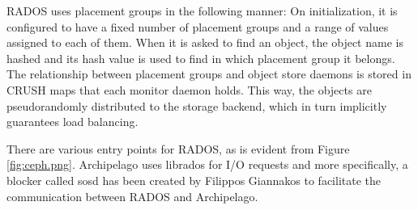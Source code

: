 RADOS uses placement groups in the following manner: On initialization, it is 
configured to have a fixed number of placement groups and a range of values 
assigned to each of them. When it is asked to find an object, the object name 
is hashed and its hash value is used to find in which placement group it 
belongs.  The relationship between placement groups and object store daemons is 
stored in CRUSH maps that each monitor daemon holds. This way, the objects are 
pseudorandomly distributed to the storage backend, which in turn implicitly 
guarantees load balancing. 

There are various entry points for RADOS, as is evident from Figure 
\ref{fig:ceph.png}. Archipelago uses librados for I/O requests and more 
specifically, a blocker called sosd\cite{sosd} has been created by Filippos 
Giannakos to facilitate the communication between RADOS and Archipelago.


